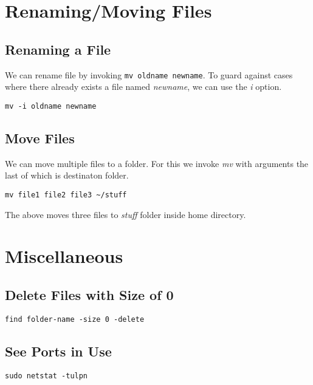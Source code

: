 \documentclass[a4paper, 12pt]{article}
\begin{document}
\section{Renaming/Moving Files}
\subsection{Renaming a File}
We can rename file by invoking \verb|mv oldname newname|.
To guard against cases where there already exists a file named \emph{newname}, we can use the \emph{i} option.
\begin{verbatim}
mv -i oldname newname
\end{verbatim}
\subsection{Move Files}
We can move multiple files to a folder. For this we invoke \emph{mv} with arguments the last of which is destinaton folder.
\begin{verbatim}
mv file1 file2 file3 ~/stuff
\end{verbatim}
The above moves three files to \emph{stuff} folder inside home directory.

\section{Miscellaneous}
\subsection{Delete Files with Size of 0}
\verb|find folder-name -size 0 -delete|
\subsection{See Ports in Use}
\verb|sudo netstat -tulpn|
\end{document}
